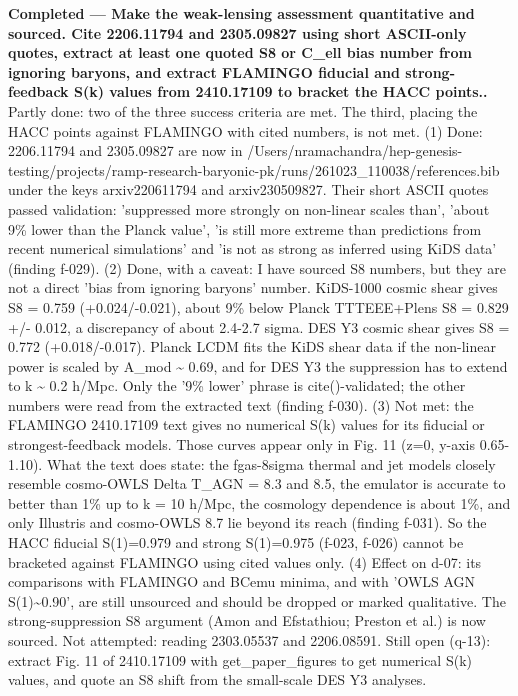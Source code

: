 \documentclass[11pt,a4paper]{article}
\begin{document}
\textbf{Completed --- Make the weak-lensing assessment quantitative and sourced. Cite 2206.11794 and 2305.09827 using short ASCII-only quotes, extract at least one quoted S8 or C\_ell bias number from ignoring baryons, and extract FLAMINGO fiducial and strong-feedback S(k) values from 2410.17109 to bracket the HACC points..} Partly done: two of the three success criteria are met. The third, placing the HACC points against FLAMINGO with cited numbers, is not met. (1) Done: 2206.11794 and 2305.09827 are now in /Users/nramachandra/hep-genesis-testing/projects/ramp-research-baryonic-pk/runs/261023\_110038/references.bib under the keys arxiv220611794 and arxiv230509827. Their short ASCII quotes passed validation: 'suppressed more strongly on non-linear scales than', 'about 9\% lower than the Planck value', 'is still more extreme than predictions from recent numerical simulations' and 'is not as strong as inferred using KiDS data' (finding f-029). (2) Done, with a caveat: I have sourced S8 numbers, but they are not a direct 'bias from ignoring baryons' number. KiDS-1000 cosmic shear gives S8 = 0.759 (+0.024/-0.021), about 9\% below Planck TTTEEE+Plens S8 = 0.829 +/- 0.012, a discrepancy of about 2.4-2.7 sigma. DES Y3 cosmic shear gives S8 = 0.772 (+0.018/-0.017). Planck LCDM fits the KiDS shear data if the non-linear power is scaled by A\_mod \textasciitilde{} 0.69, and for DES Y3 the suppression has to extend to k \textasciitilde{} 0.2 h/Mpc. Only the '9\% lower' phrase is cite()-validated; the other numbers were read from the extracted text (finding f-030). (3) Not met: the FLAMINGO 2410.17109 text gives no numerical S(k) values for its fiducial or strongest-feedback models. Those curves appear only in Fig. 11 (z=0, y-axis 0.65-1.10). What the text does state: the fgas-8sigma thermal and jet models closely resemble cosmo-OWLS Delta T\_AGN = 8.3 and 8.5, the emulator is accurate to better than 1\% up to k = 10 h/Mpc, the cosmology dependence is about 1\%, and only Illustris and cosmo-OWLS 8.7 lie beyond its reach (finding f-031). So the HACC fiducial S(1)=0.979 and strong S(1)=0.975 (f-023, f-026) cannot be bracketed against FLAMINGO using cited values only. (4) Effect on d-07: its comparisons with FLAMINGO and BCemu minima, and with 'OWLS AGN S(1)\textasciitilde{}0.90', are still unsourced and should be dropped or marked qualitative. The strong-suppression S8 argument (Amon and Efstathiou; Preston et al.) is now sourced. Not attempted: reading 2303.05537 and 2206.08591. Still open (q-13): extract Fig. 11 of 2410.17109 with get\_paper\_figures to get numerical S(k) values, and quote an S8 shift from the small-scale DES Y3 analyses.
\end{document}
